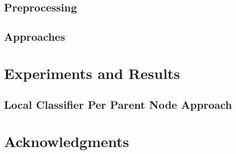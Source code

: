 \documentclass[11pt]{article}
\begin{document}
\subsection{Preprocessing}


\subsection{Approaches}


\section{Experiments and Results}

\subsection{Local Classifier Per Parent Node Approach}




\section*{Acknowledgments}




\end{document}
